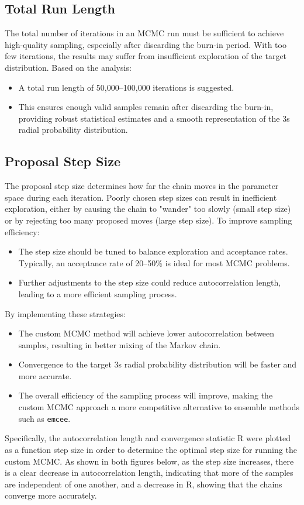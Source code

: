 \documentclass[twocolumn, 11pt]{article}
\begin{document}
\subsection{Total Run Length}
The total number of iterations in an MCMC run must be sufficient to achieve high-quality sampling, especially after discarding the burn-in period. With too few iterations, the results may suffer from insufficient exploration of the target distribution. Based on the analysis:
\begin{itemize}
    \item A total run length of 50,000--100,000 iterations is suggested.
    \item This ensures enough valid samples remain after discarding the burn-in, providing robust statistical estimates and a smooth representation of the 3s radial probability distribution.
\end{itemize}

\subsection{Proposal Step Size}
The proposal step size determines how far the chain moves in the parameter space during each iteration. Poorly chosen step sizes can result in inefficient exploration, either by causing the chain to "wander" too slowly (small step size) or by rejecting too many proposed moves (large step size). To improve sampling efficiency:
\begin{itemize}
    \item The step size should be tuned to balance exploration and acceptance rates. Typically, an acceptance rate of 20--50\% is ideal for most MCMC problems.
    \item Further adjustments to the step size could reduce autocorrelation length, leading to a more efficient sampling process.
\end{itemize}

By implementing these strategies:
\begin{itemize}
    \item The custom MCMC method will achieve lower autocorrelation between samples, resulting in better mixing of the Markov chain.
    \item Convergence to the target 3s radial probability distribution will be faster and more accurate.
    \item The overall efficiency of the sampling process will improve, making the custom MCMC approach a more competitive alternative to ensemble methods such as \texttt{emcee}.
\end{itemize}
Specifically, the autocorrelation length and convergence statistic R were plotted as a function step size in order to determine the optimal step size for running the custom MCMC. As shown in both figures below, as the step size increases, there is a clear decrease in autocorrelation length, indicating that more of the samples are independent of one another, and a decrease in R, showing that the chains converge more accurately. 
\end{document}
